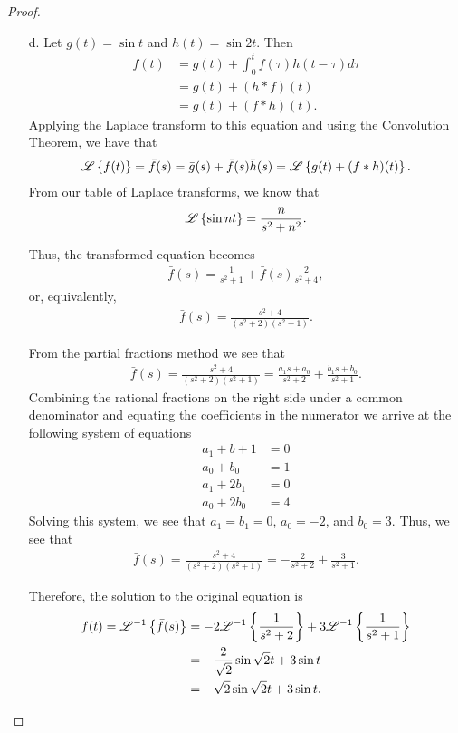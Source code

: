 \begin{proof}
\begin{enumerate}
    \item[d.] Let $g(t) = \sin t$ and $h(t) = \sin 2 t$. Then
      \begin{align*}
        f(t) &= g(t) + \int_0^t f(\tau)h(t-\tau) d\tau \\
        &= g(t) + (h \ast f)(t) \\
        &= g(t) + (f \ast h)(t).
      \end{align*}
      Applying the Laplace transform to this equation and using the Convolution Theorem, we have that
      \begin{align*}
        \mathscr{L}\left\{ {f(t)} \right\} = \bar{f}(s) = \bar{g}(s) + \bar{f}(s)\bar{h}(s) = \mathscr{L}\left\{ {g(t) + (f \ast h)(t)} \right\}.
      \end{align*}
      From our table of Laplace transforms, we know that
      \begin{align*}
        \mathscr{L}\left\{ {\sin n t} \right\} = \frac{n}{s^2 + n^2}.
      \end{align*}

      Thus, the transformed equation becomes
      \begin{align*}
        \bar{f}(s) = \frac{1}{s^2 + 1} + \bar{f}(s)\frac{2}{s^2 + 4},
      \end{align*}
      or, equivalently,
      \begin{align*}
        \bar{f}(s) = \frac{s^2 + 4}{(s^2+2)(s^2+1)}.
      \end{align*}

      From the partial fractions method we see that
      \begin{align*}
        \bar{f}(s) = \frac{s^2 + 4}{(s^2+2)(s^2+1)} = \frac{a_1 s + a_0}{s^2 + 2} + \frac{b_1 s + b_0}{s^2 + 1}.
      \end{align*}
      Combining the rational fractions on the right side under a common denominator and equating the coefficients in the numerator
      we arrive at the following system of equations
      \begin{align*}
        a_1 + b+1 &= 0 \\
        a_0 + b_0 &= 1 \\
        a_1 + 2b_1 &= 0 \\
        a_0 + 2b_0 &= 4
      \end{align*}
      Solving this system, we see that $a_1 = b_1 = 0$, $\displaystyle a_0 = -2$,
      and $\displaystyle b_0 = 3$. Thus, we see that
      \begin{align*}
        \bar{f}(s) = \frac{s^2 + 4}{(s^2+2)(s^2+1)} = -\frac{2}{s^2 + 2} + \frac{3}{s^2 + 1}.
      \end{align*}

      Therefore, the solution to the original equation is
      \begin{align*}
        f(t) = \mathscr{L}^{-1}\left\{ {\bar{f}(s)} \right\} &= -2\mathscr{L}^{-1}\left\{ {\frac{1}{s^2 + 2}} \right\} + 3\mathscr{L}^{-1}\left\{ {\frac{1}{s^2 + 1}} \right\} \\
        &= -\frac{2}{\sqrt{2}}\sin \sqrt{2}t + 3 \sin t \\
        &= - \sqrt{2}\sin \sqrt{2}t + 3 \sin t.
      \end{align*}


  \end{enumerate}
\end{proof}
\newpage
